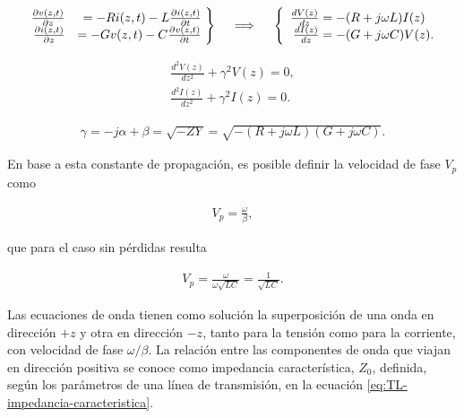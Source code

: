 \begin{align}
	\label{eq:Telegrafista}
	\left. \begin{array}{rr@{\mskip\thickmuskip}l}
	\frac{\partial v(z,t)}{\partial z} & = -R i(z,t) - L \frac{\partial i(z,t)}{\partial t}\\
	\frac{\partial i(z,t)}{\partial z} & = -G v(z,t) - C \frac{\partial v(z,t)}{\partial t}
	\end{array}\right\} \quad \implies \quad \left\{\begin{array}{r@{\mskip\thickmuskip}l}
	\frac{dV(z)}{dz} & = -(R+j\omega L)I(z) \\
	\frac{dI(z)}{dz} & = -(G+j\omega C)V(z).
	\end{array}\right.
\end{align}


\begin{equation}
\begin{aligned}
	\frac{d^2 V(z)}{dz^2} + \gamma^2 V(z) = 0, \\
	\frac{d^2 I(z)}{dz^2} + \gamma^2 I(z) = 0.
\end{aligned}
\label{eq:ec-onda-TL}
\end{equation}

\begin{align}
	\label{eq:gamma-tl}
	\gamma = -j\alpha + \beta = \sqrt{-ZY} = \sqrt{-(R+j\omega L)(G+j\omega C)}.
\end{align}

En base a esta constante de propagación, es posible definir la velocidad de fase $V_p$ como

\begin{align}
	V_p = \frac{\omega}{\beta},
\end{align}

que para el caso sin pérdidas resulta

\begin{align}
	\label{eq:vprop-linea-ideal}
	V_p = \frac{\omega}{\omega \sqrt{LC}} = \frac{1}{\sqrt{LC}}.
\end{align}

Las ecuaciones de onda tienen como solución la superposición de una onda en dirección $+z$ y otra en dirección $-z$, tanto para la tensión como para la corriente, con velocidad de fase $\omega/\beta$. La relación entre las componentes de onda que viajan en dirección positiva se conoce como impedancia característica, $Z_0$, definida, según los parámetros de una línea de transmisión, en la ecuación \ref{eq:TL-impedancia-caracteristica}.
 
